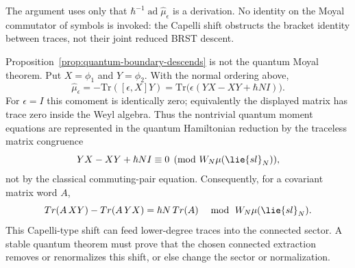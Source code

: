 \documentclass[11pt]{memoir}
\begin{document}
\begin{rmk}
  The argument uses only that
  $\hbar^{-1}\operatorname{ad}\widehat\mu_\epsilon$ is a derivation. No
  identity on the Moyal commutator of symbols is invoked: the Capelli shift
  obstructs the bracket identity between traces, not their joint reduced BRST
  descent.
\end{rmk}

\begin{rmk}\label{rmk:normal-ordering-obstruction}
  Proposition~\ref{prop:quantum-boundary-descends} is not the quantum Moyal
  theorem. Put $X=\phi_1$ and $Y=\phi_2$. With the normal ordering above,
  $$\widehat\mu_\epsilon=-\mathrm{Tr}([\epsilon,X]Y)
    =\mathrm{Tr}\bigl(\epsilon(YX-XY+\hbar N I)\bigr).$$
  For $\epsilon=I$ this comoment is identically zero; equivalently the
  displayed matrix has trace zero inside the Weyl algebra. Thus the nontrivial
  quantum moment equations are represented in the quantum Hamiltonian
  reduction by the traceless matrix congruence
  $$YX-XY+\hbar N I\equiv0
    \pmod{\mathcal W_N\widehat\mu(\lie{sl}_N)},$$
  not by the classical commuting-pair equation. Consequently, for a covariant
  matrix word $A$,
  $$\mathrm{Tr}(A\,XY)-\mathrm{Tr}(A\,YX)
    =\hbar N\,\mathrm{Tr}(A)
    \quad \bmod\ \mathcal W_N\widehat\mu(\lie{sl}_N).$$
  This Capelli-type shift can feed lower-degree traces into the connected
  sector. A stable quantum theorem must prove that the chosen connected
  extraction removes or renormalizes this shift, or else change the sector or
  normalization.
\end{rmk}
\end{document}
